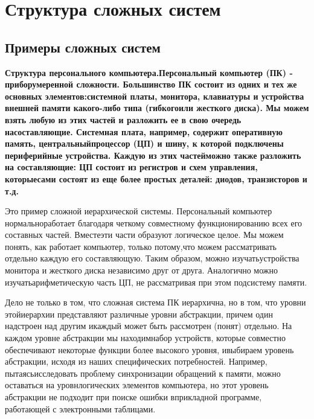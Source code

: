 \documentclass[11pt]{article}
\begin{document}
\section{Структура сложных систем}
\subsection{Примеры сложных систем}
\bf Структура персонального компьютера.\rm Персональный компьютер (ПК) - прибор\linebreak умеренной сложности. Большинство ПК состоит из одних и тех же основных элементов:\linebreak системной платы, монитора, клавиатуры и устройства внешней памяти какого-либо типа (гибкого\linebreak или жесткого диска). Мы можем взять любую из этих частей и разложить ее в свою очередь на\linebreak составляющие. Системная плата, например, содержит оперативную память, центральный\linebreak процессор (ЦП) и шину, к которой подключены периферийные устройства. Каждую из этих частей\linebreak можно также разложить на составляющие: ЦП состоит из регистров и схем управления, которые\linebreak сами состоят из еще более простых деталей: диодов, транзисторов и т.д. \bigskip 

Это пример сложной иерархической системы. Персональный компьютер нормально\linebreak работает благодаря четкому совместному функционированию всех его составных частей. Вместе\linebreak эти части образуют логическое целое. Мы можем понять, как работает компьютер, только потому,\linebreak что можем рассматривать отдельно каждую его составляющую. Таким образом, можно изучать\linebreak устройства монитора и жесткого диска независимо друг от друга. Аналогично можно изучать\linebreak арифметическую часть ЦП, не рассматривая при этом подсистему памяти. \bigskip 

Дело не только в том, что сложная система ПК иерархична, но в том, что уровни этой\linebreak иерархии представляют различные уровни абстракции, причем один надстроен над другим и\linebreak каждый может быть рассмотрен (понят) отдельно. На каждом уровне абстракции мы находим\linebreak набор устройств, которые совместно обеспечивают некоторые функции более высокого уровня, и\linebreak выбираем уровень абстракции, исходя из наших специфических потребностей. Например, пытаясь\linebreak исследовать проблему синхронизации обращений к памяти, можно оставаться на уровн логических элементов компьютера, но этот уровень абстракции не подходит при поиске ошибки в\linebreak прикладной программе, работающей с электронными таблицами. \bigskip 
\end{document}
